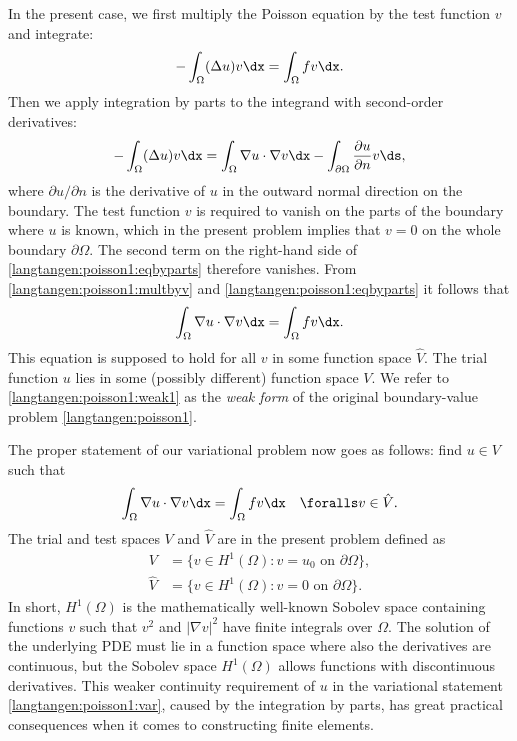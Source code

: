 In the present case, we first multiply the Poisson equation by the test
function $v$ and integrate:
\begin{equation}
\label{langtangen:poisson1:multbyv}
 -\int_\Omega (\Delta u)v \dx = \int_\Omega fv\dx.\end{equation}
Then we apply integration by parts to the integrand with
second-order derivatives:
\begin{equation}
\label{langtangen:poisson1:eqbyparts}
 -\int_\Omega (\Delta u) v \dx
   = \int_\Omega \nabla u\cdot\nabla v\dx -
     \int_{\partial\Omega} \frac{\partial u}{\partial n} v\ds,
\end{equation}
where $\partial u / \partial n$ is the
derivative of $u$ in the outward normal direction on the boundary.
The test function $v$ is required to vanish on the parts of the
boundary where $u$ is known, which in the present problem implies that
$v=0$ on the whole boundary $\partial\Omega$.  The second term on the
right-hand side of \eqref{langtangen:poisson1:eqbyparts} therefore
vanishes.  From \eqref{langtangen:poisson1:multbyv} and
\eqref{langtangen:poisson1:eqbyparts} it follows that
\begin{equation}
  \int_\Omega\nabla u\cdot\nabla v\dx = \int_\Omega fv\dx.
\label{langtangen:poisson1:weak1}
\end{equation}
This equation is supposed to hold for all $v$ in some function space
$\hat V$. The trial function $u$ lies in some (possibly different)
function space $V$.  We refer to \eqref{langtangen:poisson1:weak1} as
the \emph{weak form} of the original boundary-value problem
\eqref{langtangen:poisson1}.

The proper statement of
our variational problem now goes as follows:
find $u \in V$ such that
\begin{equation} \label{langtangen:poisson1:var}
  \int_{\Omega} \nabla u \cdot \nabla v \dx =
  \int_{\Omega} fv \dx
  \quad \foralls v \in \hat{V}.
\end{equation}
The trial and test spaces $V$ and $\hat{V}$ are in the present
problem defined as
\begin{equation}
  \begin{split}
     V      &= \{v \in H^1(\Omega) : v = u_0 \mbox{ on } \partial\Omega\}, \\
    \hat{V} &= \{v \in H^1(\Omega) : v = 0 \mbox{ on } \partial\Omega\}.
  \end{split}
\end{equation}
In short, $H^1(\Omega)$ is the mathematically well-known Sobolev
space containing functions $v$ such that $v^2$ and $|\nabla v|^2$
have finite integrals over $\Omega$. The solution of the underlying PDE
must lie in a function space where also the derivatives are continuous,
but the Sobolev space $H^1(\Omega)$ allows functions with discontinuous
derivatives. This weaker continuity requirement of $u$ in the variational
statement \eqref{langtangen:poisson1:var}, caused by the integration by
parts, has great practical consequences when it comes to constructing
finite elements.

